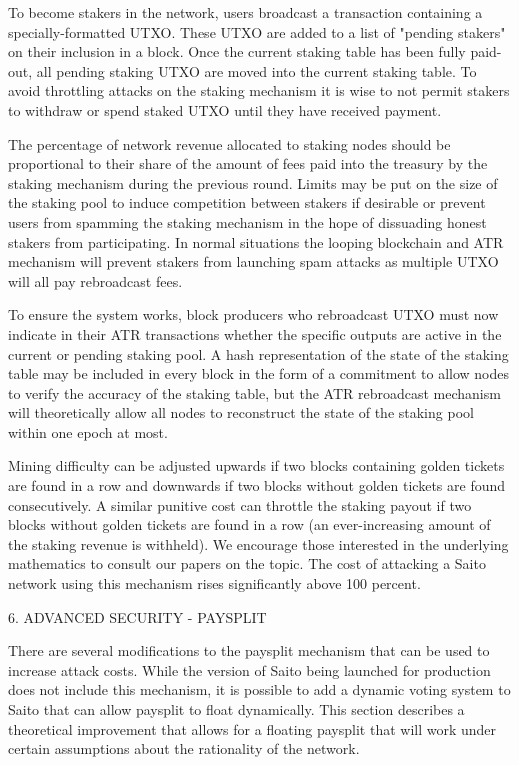 \documentclass[11pt, oneside]{article}   	%
\begin{document}
\begin{multicols}{2}
To become stakers in the network, users broadcast a transaction containing a specially-formatted UTXO. These UTXO are added to a list of "pending stakers" on their inclusion in a block. Once the current staking table has been fully paid-out, all pending staking UTXO are moved into the current staking table. To avoid throttling attacks on the staking mechanism it is wise to not permit stakers to withdraw or spend staked UTXO until they have received payment. 

The percentage of network revenue allocated to staking nodes should be proportional to their share of the amount of fees paid into the treasury by the staking mechanism during the previous round. Limits may be put on the size of the staking pool to induce competition between stakers if desirable or prevent users from spamming the staking mechanism in the hope of dissuading honest stakers from participating. In normal situations the looping blockchain and ATR mechanism will prevent stakers from launching spam attacks as multiple UTXO will all pay rebroadcast fees.

To ensure the system works, block producers who rebroadcast UTXO must now indicate in their ATR transactions whether the specific outputs are active in the current or pending staking pool. A hash representation of the state of the staking table may be included in every block in the form of a commitment to allow nodes to verify the accuracy of the staking table, but the ATR rebroadcast mechanism will theoretically allow all nodes to reconstruct the state of the staking pool within one epoch at most.

Mining difficulty can be adjusted upwards if two blocks containing golden tickets are found in a row and downwards if two blocks without golden tickets are found consecutively. A similar punitive cost can throttle the staking payout if two blocks without golden tickets are found in a row (an ever-increasing amount of the staking revenue is withheld). We encourage those interested in the underlying mathematics to consult our papers on the topic. The cost of attacking a Saito network using this mechanism rises significantly above 100 percent. 


6. ADVANCED SECURITY - PAYSPLIT

There are several modifications to the paysplit mechanism that can be used to increase attack costs. While the version of Saito being launched for production does not include this mechanism, it is possible to add a dynamic voting system to Saito that can allow paysplit to float dynamically. This section describes a theoretical improvement that allows for a floating paysplit that will work under certain assumptions about the rationality of the network.


\end{multicols}
\end{document}
